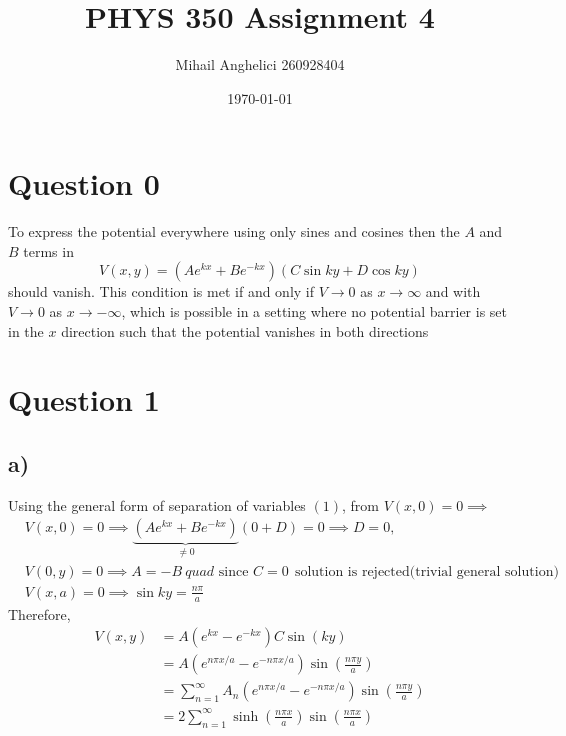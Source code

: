 \documentclass[12pt]{article}
\title{PHYS 350 Assignment 4}
\author{Mihail Anghelici 260928404 }
\date{\today}
\theoremstyle{definition}
\theoremstyle{definition}
\theoremstyle{definition}
\theoremstyle{definition}
\theoremstyle{definition}
\theoremstyle{example}
\theoremstyle{note}
\theoremstyle{remark}
\theoremstyle{example}
\begin{document}
	\maketitle
		\section*{Question 0}
			To express the potential everywhere using only sines and cosines then the $A$ and $B$ terms in 
			\begin{equation}
				V(x,y) = (Ae^{kx} + Be^{-kx})(C\sin ky + D\cos ky)
			\end{equation} 
			should vanish. This condition is met if and only if $V \to 0$ as $x \to \infty$ and with $V \to 0 $ as $x \to -\infty$, which is possible in a setting where no potential barrier is set in the $x$ direction such that the potential vanishes in both directions
		\section*{Question 1}
		\subsection*{a) }
			Using the general form of separation of variables $(1)$, from $V(x,0) =0  \implies$
			\begin{align*}
				&V(x,0) = 0 \implies \underbrace{(Ae^{kx} + Be^{-kx})}_{\neq 0} (0 + D) =0 \implies D = 0,\\
				&V(0,y) =0 \implies A = - B \ quad \text{ since } C=0 \ \ \text{solution is rejected(trivial general solution)}\\
				&V(x,a) = 0 \implies \sin ky = \frac{n\pi }{a} 
			\end{align*}
			Therefore, 
			\begin{align*}
				V(x,y) &= A(e^{kx} - e^{-kx})C\sin(ky) \\
				&= A(e^{n\pi x /a} - e^{-n\pi x /a}) \sin\left(\frac{n \pi y}{a}\right) \\
				&= \sum_{n=1}^{\infty} A_{n} (e^{n\pi x /a} - e^{-n\pi x /a}) \sin\left(\frac{n \pi y}{a}\right) \\
				&= 2 \sum_{n=1}^{\infty} \sinh\left(\frac{n \pi x}{a}\right) \sin\left(\frac{n \pi x}{a}\right)
			\end{align*}
\end{document}
